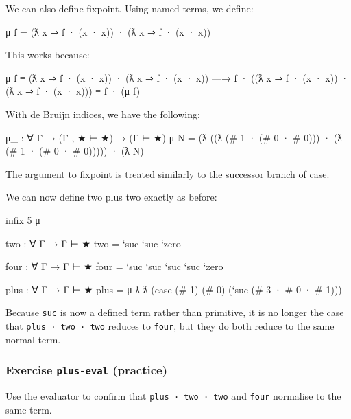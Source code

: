 We can also define fixpoint. Using named terms, we define:

\begin{myDisplay}
μ f = (ƛ x ⇒ f · (x · x)) · (ƛ x ⇒ f · (x · x))
\end{myDisplay}

This works because:

\begin{myDisplay}
  μ f
≡
  (ƛ x ⇒ f · (x · x)) · (ƛ x ⇒ f · (x · x))
—→
  f · ((ƛ x ⇒ f · (x · x)) · (ƛ x ⇒ f · (x · x)))
≡
  f · (μ f)
\end{myDisplay}

With de Bruijn indices, we have the following:

\begin{fence}
\begin{code}
μ_ : ∀ {Γ} → (Γ , ★ ⊢ ★) → (Γ ⊢ ★)
μ N  =  (ƛ ((ƛ (# 1 · (# 0 · # 0))) · (ƛ (# 1 · (# 0 · # 0))))) · (ƛ N)
\end{code}
\end{fence}

The argument to fixpoint is treated similarly to the successor branch of
case.

We can now define two plus two exactly as before:

\begin{fence}
\begin{code}
infix 5 μ_

two : ∀ {Γ} → Γ ⊢ ★
two = `suc `suc `zero

four : ∀ {Γ} → Γ ⊢ ★
four = `suc `suc `suc `suc `zero

plus : ∀ {Γ} → Γ ⊢ ★
plus = μ ƛ ƛ (case (# 1) (# 0) (`suc (# 3 · # 0 · # 1)))
\end{code}
\end{fence}

Because \texttt{\textasciigrave{}suc} is now a defined term rather than
primitive, it is no longer the case that \texttt{plus\ ·\ two\ ·\ two}
reduces to \texttt{four}, but they do both reduce to the same normal
term.

\hypertarget{exercise-plus-eval-practice}{%
\subsubsection{\texorpdfstring{Exercise \texttt{plus-eval}
(practice)}{Exercise plus-eval (practice)}}\label{exercise-plus-eval-practice}}

Use the evaluator to confirm that \texttt{plus\ ·\ two\ ·\ two} and
\texttt{four} normalise to the same term.

